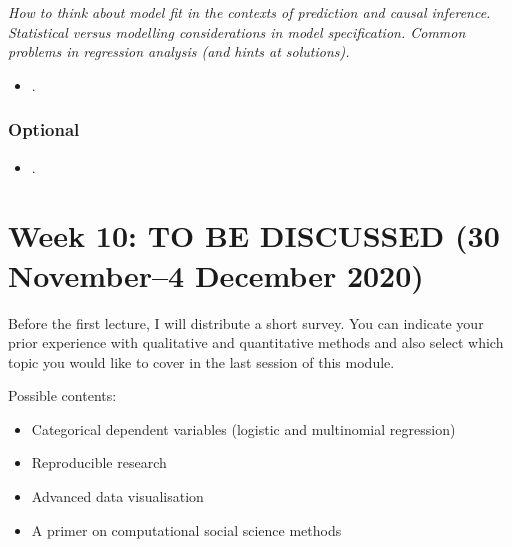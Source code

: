 \documentclass[abstract=on,parskip=full,headings=standardclasses,fontsize=11pt,paper=a4]{scrartcl}
\begin{document}
\textit{How to think about model fit in the contexts of prediction and causal inference. Statistical versus modelling considerations in model specification. Common problems in regression analysis (and hints at solutions).}

\begin{itemize}
\item {}.
\end{itemize}

\subsubsection*{Optional}
\begin{itemize}
\item {}.
\end{itemize}


 
\section{Week 10: TO BE DISCUSSED  (30 November--4 December 2020)}

Before the first lecture, I will distribute a short survey. You can indicate your prior experience with qualitative and quantitative methods and also select which topic you would like to cover in the last session of this module. 

Possible contents: 

\begin{itemize}
\item Categorical dependent variables (logistic and multinomial regression)
\item Reproducible research
\item Advanced data visualisation
\item A primer on computational social science methods
\end{itemize}

\newpage
\sloppy
\renewcommand*{\bibfont}{\small}
\onehalfspacing
\setlength{\bibitemsep}{0.2em} %
\printbibliography
\end{document}

